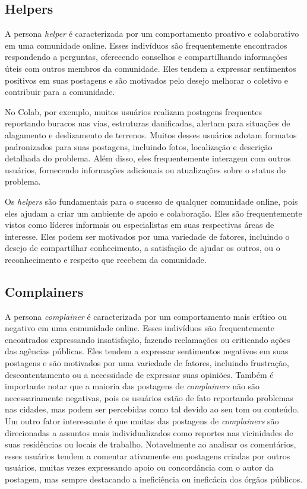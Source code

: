 \subsection{Helpers}

A persona \textit{helper} é caracterizada por um comportamento proativo e colaborativo em uma comunidade online. Esses indivíduos são frequentemente encontrados respondendo a perguntas, oferecendo conselhos e compartilhando informações úteis com outros membros da comunidade. Eles tendem a expressar sentimentos positivos em suas postagens e são motivados pelo desejo melhorar o coletivo e contribuir para a comunidade.

No Colab, por exemplo, muitos usuários realizam postagens frequentes reportando buracos nas vias, estruturas danificadas, alertam para situações de alagamento e deslizamento de terrenos. Muitos desses usuários adotam formatos padronizados para suas postagens, incluindo fotos, localização e descrição detalhada do problema. Além disso, eles frequentemente interagem com outros usuários, fornecendo informações adicionais ou atualizações sobre o status do problema.

Os \textit{helpers} são fundamentais para o sucesso de qualquer comunidade online, pois eles ajudam a criar um ambiente de apoio e colaboração. Eles são frequentemente vistos como líderes informais ou especialistas em suas respectivas áreas de interesse. Eles podem ser motivados por uma variedade de fatores, incluindo o desejo de compartilhar conhecimento, a satisfação de ajudar os outros, ou o reconhecimento e respeito que recebem da comunidade.

\subsection{Complainers}

A persona \textit{complainer} é caracterizada por um comportamento mais crítico ou negativo em uma comunidade online. Esses indivíduos são frequentemente encontrados expressando insatisfação, fazendo reclamações ou criticando ações das agências públicas. Eles tendem a expressar sentimentos negativos em suas postagens e são motivados por uma variedade de fatores, incluindo frustração, descontentamento ou a necessidade de expressar suas opiniões. Também é importante notar que a maioria das postagens de \textit{complainers} não são necessariamente negativas, pois os usuários estão de fato reportando problemas nas cidades, mas podem ser percebidas como tal devido ao seu tom ou conteúdo. Um outro fator interessante é que muitas das postagens de \textit{complainers} são direcionadas a assuntos mais individualizados como reportes nas vicinidades de suas residências ou locais de trabalho. Notavelmente ao analisar os comentários, esses usuários tendem a comentar ativamente em postagens criadas por outros usuários, muitas vezes expressando apoio ou concordância com o autor da postagem, mas sempre destacando a ineficiência ou ineficácia dos órgãos públicos.

